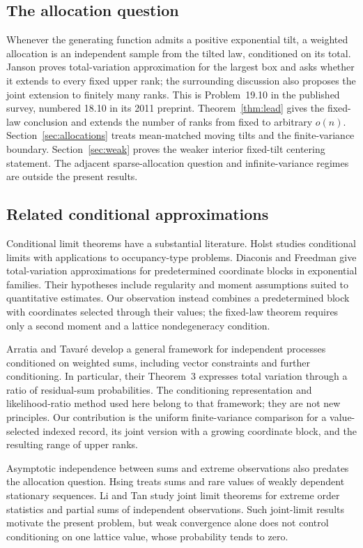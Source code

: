 \subsection{The allocation question}
Whenever the generating function admits a positive exponential tilt, a weighted allocation is an independent sample from the tilted law, conditioned on its total. Janson \cite[Theorem~19.7]{Janson} proves total-variation approximation for the largest box and asks whether it extends to every fixed upper rank; the surrounding discussion also proposes the joint extension to finitely many ranks. This is Problem~19.10 in the published survey, numbered 18.10 in its 2011 preprint. Theorem~\ref{thm:lead} gives the fixed-law conclusion and extends the number of ranks from fixed to arbitrary $o(n)$. Section~\ref{sec:allocations} treats mean-matched moving tilts and the finite-variance boundary. Section~\ref{sec:weak} proves the weaker interior fixed-tilt centering statement. The adjacent sparse-allocation question and infinite-variance regimes are outside the present results.

\subsection{Related conditional approximations}
Conditional limit theorems have a substantial literature. Holst \cite{Holst} studies conditional limits with applications to occupancy-type problems. Diaconis and Freedman \cite{DF} give total-variation approximations for predetermined coordinate blocks in exponential families. Their hypotheses include regularity and moment assumptions suited to quantitative estimates. Our observation instead combines a predetermined block with coordinates selected through their values; the fixed-law theorem requires only a second moment and a lattice nondegeneracy condition.

Arratia and Tavar\'e \cite[Sections~2--3 and~8]{AT} develop a general framework for independent processes conditioned on weighted sums, including vector constraints and further conditioning. In particular, their Theorem~3 expresses total variation through a ratio of residual-sum probabilities. The conditioning representation and likelihood-ratio method used here belong to that framework; they are not new principles. Our contribution is the uniform finite-variance comparison for a value-selected indexed record, its joint version with a growing coordinate block, and the resulting range of upper ranks.

Asymptotic independence between sums and extreme observations also predates the allocation question. Hsing \cite{Hsing} treats sums and rare values of weakly dependent stationary sequences. Li and Tan \cite{LT} study joint limit theorems for extreme order statistics and partial sums of independent observations. Such joint-limit results motivate the present problem, but weak convergence alone does not control conditioning on one lattice value, whose probability tends to zero.

